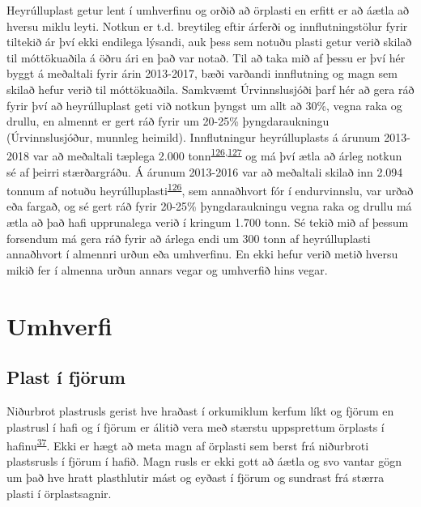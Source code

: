 \documentclass[icelandic,]{book}
\begin{document}
Heyrúlluplast getur lent í umhverfinu og orðið að örplasti en erfitt er að áætla að hversu miklu leyti. Notkun er t.d. breytileg eftir árferði og innflutningstölur fyrir tiltekið ár því ekki endilega lýsandi, auk þess sem notuðu plasti getur verið skilað til móttökuaðila á öðru ári en það var notað. Til að taka mið af þessu er því hér byggt á meðaltali fyrir árin 2013-2017, bæði varðandi innflutning og magn sem skilað hefur verið til móttökuaðila. Samkvæmt Úrvinnslusjóði þarf hér að gera ráð fyrir því að heyrúlluplast geti við notkun þyngst um allt að 30\%, vegna raka og drullu, en almennt er gert ráð fyrir um 20-25\% þyngdaraukningu (Úrvinnslusjóður, munnleg heimild).
Innflutningur heyrúlluplasts á árunum 2013-2018 var að meðaltali tæplega 2.000 tonn\textsuperscript{\protect\hyperlink{ref-Urvinnslusjouxf0ur2016}{126},\protect\hyperlink{ref-tollurinn}{127}} og má því ætla að árleg notkun sé af þeirri stærðargráðu. Á árunum 2013-2016 var að meðaltali skilað inn 2.094 tonnum af notuðu heyrúlluplasti\textsuperscript{\protect\hyperlink{ref-Urvinnslusjouxf0ur2016}{126}}, sem annaðhvort fór í endurvinnslu, var urðað eða fargað, og sé gert ráð fyrir 20-25\% þyngdaraukningu vegna raka og drullu má ætla að það hafi upprunalega verið í kringum 1.700 tonn. Sé tekið mið af þessum forsendum má gera ráð fyrir að árlega endi um 300 tonn af heyrúlluplasti annaðhvort í almennri urðun eða umhverfinu. En ekki hefur verið metið hversu mikið fer í almenna urðun annars vegar og umhverfið hins vegar.

\hypertarget{umhverfi}{%
\section*{Umhverfi}\label{umhverfi}}

\hypertarget{plast-i-fjorum}{%
\subsection*{Plast í fjörum}\label{plast-i-fjorum}}

Niðurbrot plastrusls gerist hve hraðast í orkumiklum kerfum líkt og fjörum en plastrusl í hafi og í fjörum er álitið vera með stærstu uppsprettum örplasts í hafinu\textsuperscript{\protect\hyperlink{ref-andrady2011microplastics}{37}}. Ekki er hægt að meta magn af örplasti sem berst frá niðurbroti plastsrusls í fjörum í hafið. Magn rusls er ekki gott að áætla og svo vantar gögn um það hve hratt plasthlutir mást og eyðast í fjörum og sundrast frá stærra plasti í örplastsagnir.
\end{document}
